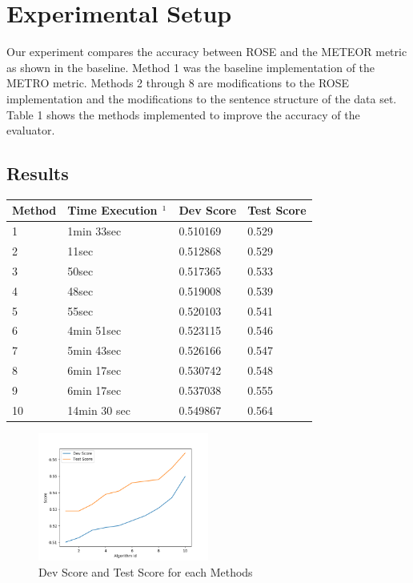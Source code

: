 \documentclass[11pt,letterpaper]{article}
\begin{document}
\section{Experimental Setup}

Our experiment compares the accuracy between ROSE and the METEOR metric as shown in the baseline. Method 1 was the baseline implementation of the METRO metric. Methods 2 through 8 are modifications to the ROSE implementation  \cite{song2011regression} and the modifications to the sentence structure of the data set. 
Table 1 shows the methods implemented to improve the accuracy of the evaluator.

	

\subsection{Results}

\begin{center}
	\begin{tabular}{| l | l | l | p{1cm} |}
	\hline
	Method & Time Execution $\footnotemark[1] $& Dev Score & Test Score \\ \hline
	1 & 1min 33sec & 0.510169 & 0.529 \\ \hline
	2 & 11sec & 0.512868 & 0.529 \\ \hline
	3 & 50sec & 0.517365 & 0.533 \\ \hline
	4 & 48sec & 0.519008 & 0.539 \\ \hline
	5 & 55sec & 0.520103 & 0.541 \\ \hline
	6 & 4min 51sec & 0.523115 & 0.546 \\ \hline
	7 & 5min 43sec & 0.526166 & 0.547 \\ \hline
	8 & 6min 17sec & 0.530742 & 0.548 \\ \hline
	9 & 6min 17sec & 0.537038 & 0.555 \\ \hline
	10 & 14min 30 sec & 0.549867 & 0.564 \\ \hline
	\end{tabular}
\end{center}

\begin{figure}
  \caption{Dev Score and Test Score for each Methods}
    \includegraphics[width=0.5\textwidth]{Figure_1}
\end{figure}
\end{document}
